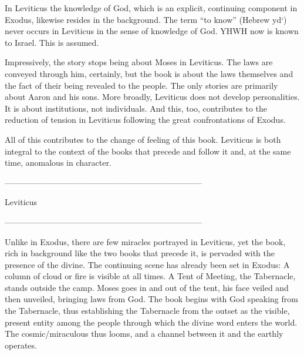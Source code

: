 {{In Leviticus the knowledge of God, which is an explicit, continuing
component in Exodus, likewise resides in the background. The term “to
know” (Hebrew yd‘) never occurs in Leviticus in the sense of knowledge
of God. YHWH now is known to Israel. This is assumed.

Impressively, the story stops being about Moses in Leviticus. The laws
are conveyed through him, certainly, but the book is about the laws
themselves and the fact of their being revealed to the people. The only
stories are primarily about Aaron and his sons. More broadly, Leviticus
does not develop personalities. It is about institutions, not
individuals. And this, too, contributes to the reduction of tension in
Leviticus following the great confrontations of Exodus.

All of this contributes to the change of feeling of this book. Leviticus
is both integral to the context of the books that precede and follow it
and, at the same time, anomalous in character.

------------------------------------------------------------------------

Leviticus

------------------------------------------------------------------------

Unlike in Exodus, there are few miracles portrayed in Leviticus, yet the
book, rich in background like the two books that precede it, is pervaded
with the presence of the divine. The continuing scene has already been
set in Exodus: A column of cloud or fire is visible at all times. A Tent
of Meeting, the Tabernacle, stands outside the camp. Moses goes in and
out of the tent, his face veiled and then unveiled, bringing laws from
God. The book begins with God speaking from the Tabernacle, thus
establishing the Tabernacle from the outset as the visible, present
entity among the people through which the divine word enters the world.
The cosmic/miraculous thus looms, and a channel between it and the
earthly operates.\\
	}
}
{
}

